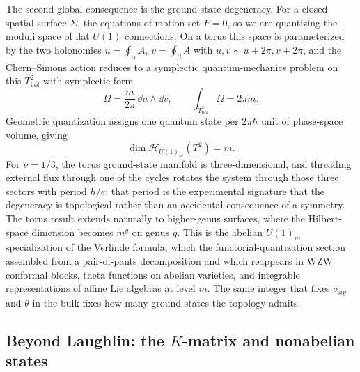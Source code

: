 The second global consequence is the ground-state degeneracy. For a closed spatial surface $\Sigma$, the equations of motion set $F=0$, so we are quantizing the moduli space of flat $U(1)$ connections. On a torus this space is parameterized by the two holonomies $u=\oint_\alpha A$, $v=\oint_\beta A$ with $u,v\sim u+2\pi,v+2\pi$, and the Chern--Simons action reduces to a symplectic quantum-mechanics problem on this $T^{2}_{\mathrm{hol}}$ with symplectic form
\begin{equation}
  \Omega = \frac{m}{2\pi}\,\dd u\wedge\dd v,
  \qquad
  \int_{T^{2}_{\mathrm{hol}}}\Omega = 2\pi m.
  \label{eq:fqhe-symplectic}
\end{equation}
Geometric quantization assigns one quantum state per $2\pi\hbar$ unit of phase-space volume, giving
\begin{equation}
  \dim\mathcal{H}_{U(1)_m}(T^{2}) = m.
  \label{eq:fqhe-torus-degeneracy}
\end{equation}
For $\nu=1/3$, the torus ground-state manifold is three-dimensional, and threading external flux through one of the cycles rotates the system through those three sectors with period $h/e$; that period is the experimental signature that the degeneracy is topological rather than an accidental consequence of a symmetry. The torus result extends naturally to higher-genus surfaces, where the Hilbert-space dimension becomes $m^{g}$ on genus $g$. This is the abelian $U(1)_m$ specialization of the Verlinde formula, which the functorial-quantization section assembled from a pair-of-pants decomposition and which reappears in WZW conformal blocks, theta functions on abelian varieties, and integrable representations of affine Lie algebras at level $m$. The same integer that fixes $\sigma_{xy}$ and $\theta$ in the bulk fixes how many ground states the topology admits.

\subsection{Beyond Laughlin: the $K$-matrix and nonabelian states}
\label{subsec:fqhe-beyond}

